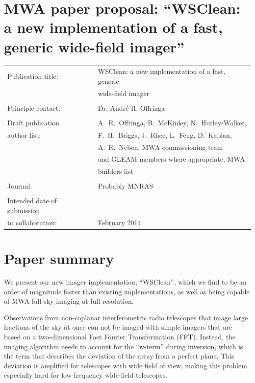 \documentclass[a4paper,10pt]{article}
\begin{document}
\label{firstpage}
\section*{MWA paper proposal: ``WSClean: a new implementation of a fast, generic wide-field imager''}
\begin{tabular}{ll}
Publication title: & WSClean: a new implementation of a fast, generic \\
                   & wide-field imager\\
                   & \\
Principle contact: & Dr. Andr\'e R. Offringa \\
                   & \\
Draft publication        & A.~R.~Offringa, B.~McKinley, N.~Hurley-Walker, \\
\hspace{5mm}author list: & F.~H.~Briggs, J.~Rhee, L.~Feng, D.~Kaplan, \\
                         & A.~R.~Neben, MWA commissioning team \\
                         & and GLEAM members where appropriate, MWA \\
                         & builders list \\
                   & \\
Journal:           & Probably MNRAS\\
                   & \\
Intended date of submission\\
\hspace{5mm}to collaboration: & February 2014\\
\end{tabular}

\section*{Paper summary}
We present our new imager implementation, ``WSClean'', which we find to be an order of magnitude faster than existing implementations, as well as being capable of MWA full-sky imaging at full resolution.

Observations from non-coplanar interferometric radio telescopes that image large fractions of the sky at once can not be imaged with simple imagers that are based on a two-dimensional Fast Fourier Transformation (FFT). Instead, the imaging algorithm needs to account for the ``w-term'' during inversion, which is the term that describes the deviation of the array from a perfect plane. This deviation is amplified for telescopes with wide field of view, making this problem especially hard for low-frequency wide-field telescopes.
\end{document}
